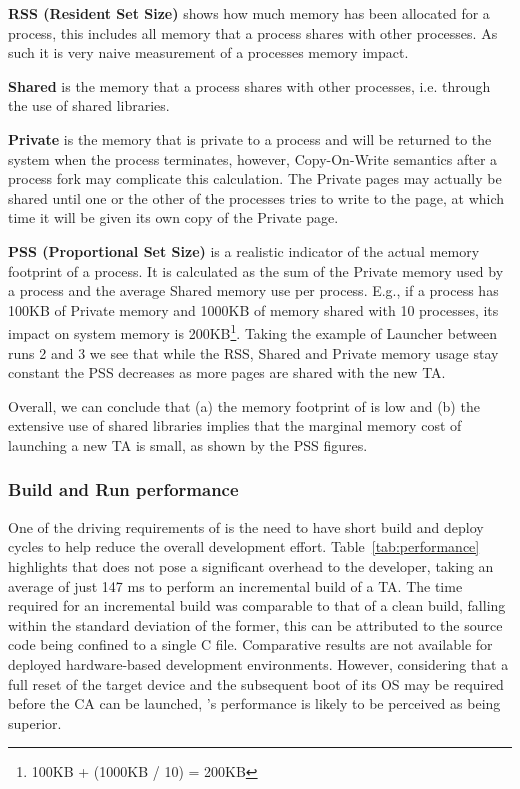 \documentclass[10pt,conference,letterpaper]{IEEEtran}
\newcommand{\opentee}{\protect{TEE-Vi}\xspace}
\newcommand{\opentee}{\protect{Open-TEE}\xspace}
\begin{document}
\noindent\textbf{RSS (Resident Set Size)} shows how much memory has been allocated for a process, this includes all memory that a process shares with other processes. As such it is very naive measurement of a processes memory impact.

\noindent\textbf{Shared} is the memory that a process shares with other processes, i.e. through the use of shared libraries.

\noindent\textbf{Private} is the memory that is private to a process and will be returned to the system when the process terminates, however, Copy-On-Write semantics after a process fork may complicate this calculation.  The Private pages may actually be shared until one or the other of the processes tries to write to the page, at which time it will be given its own copy of the Private page.

\noindent\textbf{PSS (Proportional Set Size)} is a realistic indicator of the actual memory footprint of a process.  It is calculated as the sum of the Private memory used by a process and the average Shared memory use per process. 
E.g., if a process has 100KB of Private memory and 1000KB of memory shared with 10 processes, its impact on system memory is 200KB\footnote{100KB + (1000KB / 10) = 200KB}. Taking the example of Launcher between runs 2 and 3 we see that while the RSS, Shared and Private memory usage stay constant the PSS decreases as more pages are shared with the new TA.

Overall, we can conclude that (a) the memory footprint of \opentee is low and (b) the extensive use of shared libraries implies that the marginal memory cost of launching a new TA is small, as shown by the PSS figures.

\subsubsection{Build and Run performance}
One of the driving requirements of \opentee is the need to have short build and deploy cycles to help reduce the overall development effort. Table~\ref{tab:performance} highlights that \opentee does not pose a significant overhead to the developer, taking an average of just 147 ms to perform an incremental build of a TA. The time required for an incremental build was comparable to that of a clean build, falling within the standard deviation of the former, this can be attributed to the source code being confined to a single C file. Comparative results are not available for deployed hardware-based development environments. However, considering that a full reset of the target device and the subsequent boot of its OS may be required before the CA can be launched, \opentee's performance is likely to be perceived as being superior.
\end{document}
